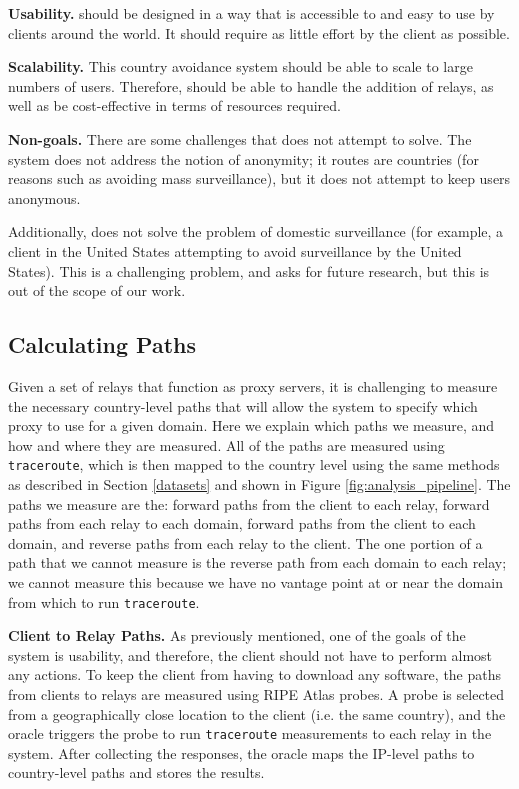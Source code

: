 {\bf Usability.} \system{} should be designed in a way that is accessible to and 
easy to use by clients around the world.  It should require as little effort by 
the client as possible.

{\bf Scalability.}  This country avoidance system should be able to scale to 
large numbers of users.  Therefore, \system{} should be able to handle the addition
 of relays, as well as be cost-effective in terms of resources required.

{\bf Non-goals.}  There are some challenges that \system{} does not attempt to 
solve.  The system does not address the notion of anonymity; it routes are 
countries (for reasons such as avoiding mass surveillance), but it does not 
attempt to keep users anonymous.  

Additionally, \system{} does not solve the problem of domestic surveillance (for 
example, a client in the United States attempting to avoid surveillance by the 
United States).  This is a challenging problem, and asks for future research, 
but this is out of the scope of our work.

\subsection{Calculating Paths}
Given a set of relays that function as proxy servers, it is challenging to 
measure the necessary country-level paths that will allow the system to specify 
which proxy to use for a given domain.  Here we explain which paths we measure, 
and how and where they are measured.  All of the paths are measured using {\tt 
traceroute}, which is then mapped to the country level using the same methods as 
described in Section \ref{datasets} and shown in Figure 
\ref{fig:analysis_pipeline}.  The paths we measure are the: forward paths from 
the client to each relay, forward paths from each relay to each domain, forward 
paths from the client to each domain, and reverse paths from each relay to the 
client.  The one portion of a path that we cannot measure is the reverse path 
from each domain to each relay; we cannot measure this because we have no 
vantage point at or near the domain from which to run {\tt traceroute}.

{\bf Client to Relay Paths.} As previously mentioned, one of the goals of the 
system is usability, and therefore, the client should not have to perform 
almost any actions.  To keep the client from having to download any software, 
the paths from clients to relays are measured using RIPE Atlas probes.  A probe 
is selected from a geographically close location to the client (i.e. the same 
country), and the oracle triggers the probe to run {\tt traceroute} measurements 
to each relay in the system.  After collecting the responses, the oracle maps 
the IP-level paths to country-level paths and stores the results.

